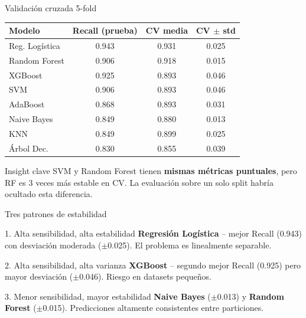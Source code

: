 \documentclass[10pt,aspectratio=169]{beamer}
\begin{document}
\begin{frame}{Validación cruzada 5-fold}
\begin{center}
\scriptsize
\begin{tabular}{lccc}
\toprule
\textbf{Modelo} & \textbf{Recall (prueba)} & \textbf{CV media} & \textbf{CV $\pm$ std} \\
\midrule
Reg. Logística & \cellcolor{verdemejor}0.943 & 0.931 & 0.025 \\
Random Forest & 0.906 & \cellcolor{verdemejor}0.918 & \cellcolor{verdemejor}0.015 \\
XGBoost & 0.925 & 0.893 & \cellcolor{rojomenor}0.046 \\
SVM & 0.906 & 0.893 & \cellcolor{rojomenor}0.046 \\
AdaBoost & 0.868 & 0.893 & 0.031 \\
Naive Bayes & 0.849 & 0.880 & \cellcolor{verdemejor}0.013 \\
KNN & 0.849 & 0.899 & 0.025 \\
Árbol Dec. & \cellcolor{rojomenor}0.830 & 0.855 & 0.039 \\
\bottomrule
\end{tabular}
\end{center}

\vspace{0.5em}
\begin{alertblock}{Insight clave}
SVM y Random Forest tienen \textbf{mismas métricas puntuales}, pero RF es 3 veces más estable en CV. La evaluación sobre un solo split habría ocultado esta diferencia.
\end{alertblock}
\end{frame}

\begin{frame}{Tres patrones de estabilidad}
\begin{block}{1. Alta sensibilidad, alta estabilidad}
\textbf{Regresión Logística} -- mejor Recall (0.943) con desviación moderada ($\pm$0.025). El problema es linealmente separable.
\end{block}

\vspace{0.5em}
\begin{block}{2. Alta sensibilidad, alta varianza}
\textbf{XGBoost} -- segundo mejor Recall (0.925) pero mayor desviación ($\pm$0.046). Riesgo en datasets pequeños.
\end{block}

\vspace{0.5em}
\begin{block}{3. Menor sensibilidad, mayor estabilidad}
\textbf{Naive Bayes} ($\pm$0.013) y \textbf{Random Forest} ($\pm$0.015). Predicciones altamente consistentes entre particiones.
\end{block}
\end{frame}
\end{document}
